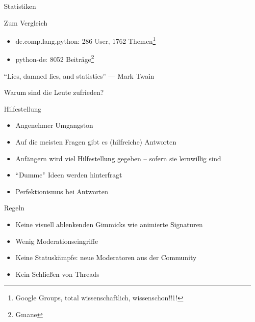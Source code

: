 \documentclass{beamer}
\begin{document}
\begin{frame}{Statistiken}
  \begin{block}{Zum Vergleich}
    \begin{itemize}
      \item de.comp.lang.python: 286 User, 1762 Themen\footnote{Google Groups, total
        wissenschaftlich, wissenschon!!1!}
      \item python-de: 8052 Beiträge\footnote{Gmane}
    \end{itemize}
  \end{block}
  \enquote{Lies, damned lies, and statistics} — Mark Twain
\end{frame}

\begin{frame}{Warum sind die Leute zufrieden?}
  \begin{block}{Hilfestellung}
    \begin{itemize}
      \item Angenehmer Umgangston
      \item Auf die meisten Fragen gibt es (hilfreiche) Antworten
      \item Anfängern wird viel Hilfestellung gegeben – sofern sie lernwillig sind
      \item \enquote{Dumme} Ideen werden hinterfragt
      \item Perfektionismus bei Antworten
    \end{itemize}
  \end{block}
  \begin{block}{Regeln}
    \begin{itemize}
      \item Keine visuell ablenkenden Gimmicks wie animierte Signaturen
      \item Wenig Moderationseingriffe
      \item Keine Statuskämpfe: neue Moderatoren aus der Community
      \item Kein Schließen von Threads
    \end{itemize}
  \end{block}
\end{frame}
\end{document}
